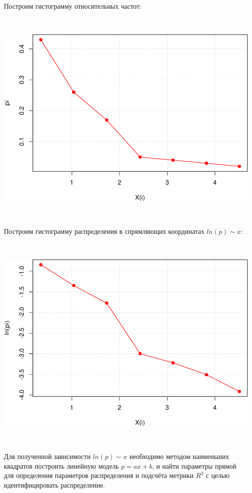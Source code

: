 \documentclass[
  14,
]{article}
\begin{document}
Построим гистограмму относительных частот:

\(\ \)

\begin{center}\includegraphics[width=0.75\linewidth]{Prac3_files/figure-latex/unnamed-chunk-26-1} \end{center}

\(\ \)

Построим гистограмму распределения в спрямляющих координатах
\(ln(p) \sim x\):

\(\ \)

\begin{center}\includegraphics[width=0.75\linewidth]{Prac3_files/figure-latex/unnamed-chunk-27-1} \end{center}

\(\ \)

Для полученной зависимости \(ln(p) \sim x\) необходимо методом
наименьших квадратов построить линейную модель \(p = ax + b\), и найти
параметры прямой для определения параметров распределения и подсчёта
метрики \(R^2\) с целью идентифицировать распределение.

\(\ \)
\end{document}
